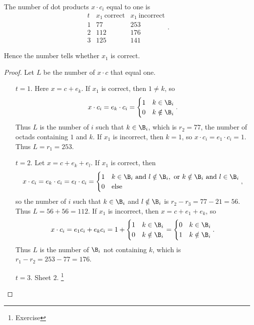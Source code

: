\begin{proposition}
The number of dot products $ x \cdot c_i $ equal to one is
$$
\begin{array}{c|cc}
t & x_1 \ \text{correct} & x_1 \ \text{incorrect} \\
\hline
1 & 77 & 253 \\
2 & 112 & 176 \\
3 & 125 & 141
\end{array}.
$$
\end{proposition}


Hence the number tells whether $ x_1 $ is correct.

\pagebreak

\begin{proof}
Let $ L $ be the number of $ x \cdot c $ that equal one.
\begin{itemize}[leftmargin=0.5in]
\item[$ t = 1 $.] Here $ x = c + e_k $. If $ x_1 $ is correct, then $ 1 \ne k $, so
$$ x \cdot c_i = e_k \cdot c_i =
\begin{cases}
1 & k \in \B_i \\
0 & k \notin \B_i \\
\end{cases}.
$$
Thus $ L $ is the number of $ i $ such that $ k \in \B_i $, which is $ r_2 = 77 $, the number of octads containing $ 1 $ and $ k $. If $ x_1 $ is incorrect, then $ k = 1 $, so $ x \cdot c_i = e_1 \cdot c_i = 1 $. Thus $ L = r_1 = 253 $.
\item[$ t = 2 $.] Let $ x = c + e_k + e_l $. If $ x_1 $ is correct, then
$$ x \cdot c_i = e_k \cdot c_i = e_l \cdot c_i =
\begin{cases}
1 & k \in \B_i \ \text{and} \ l \notin \B_i, \ \text{or} \ k \notin \B_i \ \text{and} \ l \in \B_i \\
0 & \text{else}
\end{cases},
$$
so the number of $ i $ such that $ k \in \B_i $ and $ l \notin \B_i $ is $ r_2 - r_3 = 77 - 21 = 56 $. Thus $ L = 56 + 56 = 112 $. If $ x_1 $ is incorrect, then $ x = c + e_1 + e_k $, so
$$ x \cdot c_i = e_1c_i + e_kc_i = 1 +
\begin{cases}
1 & k \in \B_i \\
0 & k \notin \B_i \\
\end{cases}
=
\begin{cases}
0 & k \in \B_i \\
1 & k \notin \B_i \\
\end{cases}.
$$
Thus $ L $ is the number of $ \B_i $ not containing $ k $, which is $ r_1 - r_2 = 253 - 77 = 176 $.
\item[$ t = 3 $.] Sheet $ 2 $. \footnote{Exercise}
\end{itemize}
\end{proof}


